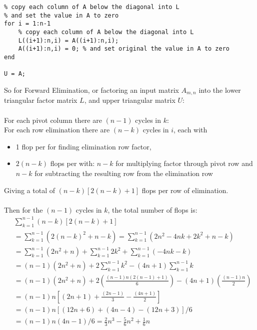 \documentclass{article}
\begin{document}
\begin{solution}
\begin{lstlisting}
% copy each column of A below the diagonal into L
% and set the value in A to zero
for i = 1:n-1
    % copy each column of A below the diagonal into L
    L((i+1):n,i) = A((i+1):n,i);
    A((i+1):n,i) = 0; % and set original the value in A to zero
end

U = A;
\end{lstlisting}

So for Forward Elimination, or factoring an input matrix $A_{m,n}$ into the lower triangular factor matrix $L$, and upper triangular matrix $U$:\\
\\
For each pivot column there are $(n-1)$ cycles in $k$:\\
For each row elimination there are $(n-k)$ cycles in $i$, each with
\begin{itemize}
\item 1 flop per for finding elimination row factor, 
\item $2(n-k)$ flops per with:
\subitem $n-k$ for multiplying factor through pivot row and
\subitem $n-k$ for subtracting the resulting row from the elimination row
\end{itemize}
Giving a total of  $(n-k)[2(n-k)+1]$ flops per row of elimination.\\
\\
Then for the $(n-1)$ cycles in $k$, the total number of flops is:
\begin{align*}
&\sum_{k=1}^{n-1} (n-k)[2(n-k)+1]\\
&= \sum_{k=1}^{n-1} (2(n-k)^{2}+n-k) = \sum_{k=1}^{n-1} (2n^{2}-4nk+2k^{2}+n-k)\\
&= \sum_{k=1}^{n-1}(2n^{2}+n) +\sum_{k=1}^{n-1} 2k^{2} +\sum_{k=1}^{n-1} (-4nk-k)\\
&= (n-1)(2n^{2}+n) +2\sum_{k=1}^{n-1} k^{2} -(4n+1)\sum_{k=1}^{n-1} k\\
&= (n-1)(2n^{2}+n) +2\left(\frac{(n-1)n(2(n-1)+1)}{6}\right) -(4n+1)\left(\frac{(n-1)n}{2}\right)\\
&= (n-1)n\left[ (2n+1) + \frac{(2n-1)}{3} -\frac{(4n+1)}{2} \right]\\
&= (n-1)n\left[ (12n+6) +(4n-4) -(12n+3) \right] /6 \\
&= (n-1)n(4n-1)/6 = \boxed{\frac{2}{3}n^{3}-\frac{5}{6}n^{2}+\frac{1}{6}n} \\
\end{align*}
\end{solution}
\end{document}
